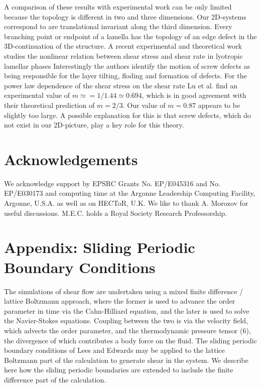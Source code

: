 \documentclass[8.5pt,twoside,twocolumn]{article}
\begin{document}
A comparison of these results with experimental work can be only limited because the topology is different in two and three dimensions.
Our 2D-systems correspond to are translational invariant along the third dimension.
Every branching point or endpoint of a lamella has the topology of an edge defect in the 3D-continuation of the structure.
A recent experimental and theoretical work studies the nonlinear relation between shear stress and shear rate in lyotropic lamellar phases \cite{Lu08}
Interestingly the authors identify the motion of screw defects as being responsible for the layer tilting, floding  and formation of defects. 
For the power law dependence of the shear stress on the shear rate Lu et al. find an experimental value of $m\simeq=1/1.44\simeq 0.694$, which is in good agreement with their theoretical prediction of $m=2/3$.
Our value of $m=0.87$ appears to be slightly too large.
A possible explanation for this is that screw defects, which do not exist in our 2D-picture, play a key role for this theory.\\



\section{Acknowledgements}
We acknowledge support by EPSRC Grants No. EP/E045316 and No. EP/E030173 and computing time at the Argonne Leadership Computing Facility, Argonne, U.S.A. as well as on HECToR, U.K.
We like to thank A. Morozov for useful discussions. 
M.E.C. holds a Royal Society Research Professorship.

\section{Appendix: Sliding Periodic Boundary Conditions}

The simulations of shear flow are undertaken using a mixed finite
difference / lattice Boltzmann approach, where the former is used
to advance the order parameter in time via the Cahn-Hilliard equation,
and the later is used to solve the Navier-Stokes equations.
Coupling between the two is
via the velocity field, which advects the order parameter, and
the thermodynamic pressure tensor (6), the divergence of which
contributes a body force on the fluid. The sliding periodic
boundary conditions of Lees and Edwards\cite{leesedwards} may be
applied to the lattice Boltzmann part of the calculation
\cite{Wagner02,Adhikari05} to generate shear in the system. We
describe here how the sliding periodic boundaries are extended to
include the finite difference part of the calculation.
\end{document}
